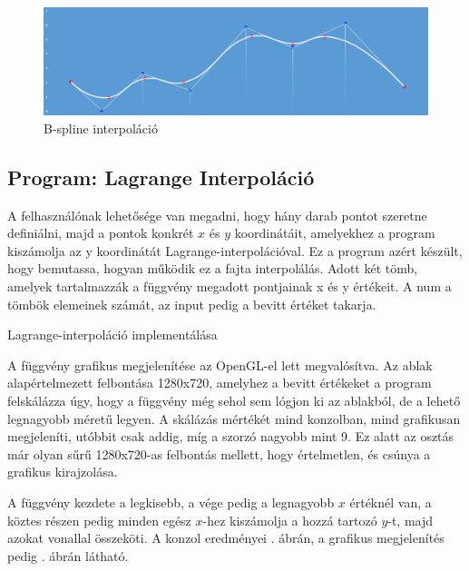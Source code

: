 \begin{figure}[h]
\centering
\includegraphics[scale=0.43]{kepek/bspline_interpol.png}
\caption{B-spline interpoláció}
\label{fig:spline}
\end{figure}

\subsection{Program: Lagrange Interpoláció}

A felhasználónak lehetősége van megadni, hogy hány darab pontot szeretne definiálni, majd a pontok konkrét $x$ és $y$ koordinátáit, amelyekhez a program kiszámolja az y koordinátát Lagrange-interpolációval. Ez a program azért készült, hogy bemutassa, hogyan működik ez a fajta interpolálás.
Adott két tömb, amelyek tartalmazzák a függvény megadott pontjainak x és y értékeit. A num a tömbök elemeinek számát, az input pedig a bevitt értéket takarja.

\begin{algorithm}[H]
 \caption{Lagrange-interpoláció implementálása}
\end{algorithm} 

A függvény grafikus megjelenítése az OpenGL-el lett megvalósítva. Az ablak alapértelmezett felbontása 1280x720, amelyhez a bevitt értékeket a program felskálázza úgy, hogy a függvény még sehol sem lógjon ki az ablakból, de a lehető legnagyobb méretű legyen. A skálázás mértékét mind konzolban, mind grafikusan megjeleníti, utóbbit csak addig, míg a szorzó nagyobb mint 9. Ez alatt az osztás már olyan sűrű 1280x720-as felbontás mellett, hogy értelmetlen, és csúnya a grafikus kirajzolása. 

A függvény kezdete a legkisebb, a vége pedig a legnagyobb $x$ értéknél van, a köztes részen pedig minden egész $x$-hez kiszámolja a hozzá tartozó $y$-t, majd azokat vonallal összeköti. A konzol eredményei . ábrán, a grafikus megjelenítés pedig . ábrán látható.


